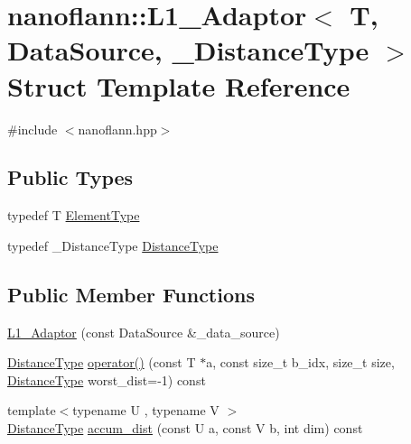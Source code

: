 \hypertarget{structnanoflann_1_1_l1___adaptor}{\section{nanoflann\-:\-:L1\-\_\-\-Adaptor$<$ T, Data\-Source, \-\_\-\-Distance\-Type $>$ Struct Template Reference}
\label{structnanoflann_1_1_l1___adaptor}
}


{\ttfamily \#include $<$nanoflann.\-hpp$>$}

\subsection*{Public Types}
\begin{DoxyCompactItemize}
\item 
typedef T \hyperlink{structnanoflann_1_1_l1___adaptor_a25cd87fbe8767f9d0db4ddf93f82c9a2}{Element\-Type}
\item 
typedef \-\_\-\-Distance\-Type \hyperlink{structnanoflann_1_1_l1___adaptor_a18f9a7c38fd2525b5797b2ae627c3957}{Distance\-Type}
\end{DoxyCompactItemize}
\subsection*{Public Member Functions}
\begin{DoxyCompactItemize}
\item 
\hyperlink{structnanoflann_1_1_l1___adaptor_abfbcf686d88f0aef5df3a104586f0612}{L1\-\_\-\-Adaptor} (const Data\-Source \&\-\_\-data\-\_\-source)
\item 
\hyperlink{structnanoflann_1_1_l1___adaptor_a18f9a7c38fd2525b5797b2ae627c3957}{Distance\-Type} \hyperlink{structnanoflann_1_1_l1___adaptor_a84e509cc50ad2bb6bc3fbe9f073ea4e3}{operator()} (const T $\ast$a, const size\-\_\-t b\-\_\-idx, size\-\_\-t size, \hyperlink{structnanoflann_1_1_l1___adaptor_a18f9a7c38fd2525b5797b2ae627c3957}{Distance\-Type} worst\-\_\-dist=-\/1) const 
\item 
{\footnotesize template$<$typename U , typename V $>$ }\\\hyperlink{structnanoflann_1_1_l1___adaptor_a18f9a7c38fd2525b5797b2ae627c3957}{Distance\-Type} \hyperlink{structnanoflann_1_1_l1___adaptor_af43d8c14ff76c2de3519d891b83bd3e5}{accum\-\_\-dist} (const U a, const V b, int dim) const 
\end{DoxyCompactItemize}
